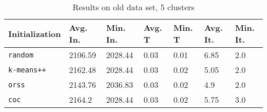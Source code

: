 \begin{table}[h]
	\begin{center}
		\begin{tabular}{|l|l|l|l|l|l|l|}
			\hline
			Initialization & Avg. In. & Min. In. & Avg. T & Min. T & Avg. It. & Min. It.\\\hline
			\texttt{random} & 2106.59 & 2028.44 & 0.03 & 0.01 & 6.85 & 2.0\\\hline
			\texttt{k-means++} & 2162.48 & 2028.44 & 0.03 & 0.02 & 5.05 & 2.0\\\hline
			\texttt{orss} & 2143.76 & 2036.83 & 0.03 & 0.02 & 4.9 & 2.0\\\hline
			\texttt{coc} & 2164.2 & 2028.44 & 0.03 & 0.02 & 5.75 & 3.0\\\hline
		\end{tabular}
		\caption{Results on old data set, 5 clusters}
		\label{tbl:old5}
	\end{center}
\end{table}

